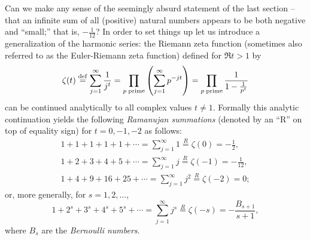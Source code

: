 Can we make any sense  of the seemingly absurd statement of the last section -- that
an infinite sum of all (positive) natural numbers appears to be both negative and ``small;'' that is, $-\frac{1}{12}$?
In order to set things up
let us introduce a generalization of the harmonic series:
the Riemann zeta function (sometimes also referred to as the Euler-Riemann zeta function)
defined for $\Re t > 1$ by
\begin{equation}
\zeta (t) \stackrel{{\rm def}}{=}
\sum_{j=1}^\infty \frac{1}{j^t}
=
\prod_{p\;{\rm prime}} \left(\sum_{j=1}^\infty p^{-jt}\right)
=
\prod_{p\;{\rm prime}} \frac{1}{1-\frac{1}{p^t}}
\label{2016-m-ds-zeta}
\end{equation}
can be  continued analytically to all complex values $t\neq 1$.
Formally this analytic continuation yields the following
{\em Ramanujan summations}  (denoted by an ``R'' on top of equality sign)
for $t=0,-1,-2$ as follows:
\begin{equation}
\begin{split}
1+1+1+1+1 + \cdots = \sum_{j=1}^\infty 1 \stackrel{R}{=} \zeta (0)  = -\frac{1}{2}
, \\
1+2+3+4+5 + \cdots = \sum_{j=1}^\infty j \stackrel{R}{=}  \zeta (-1)  = -\frac{1}{12}
, \\
1+4+9+16+25 + \cdots = \sum_{j=1}^\infty j^2 \stackrel{R}{=}  \zeta (-2)  = 0;
\end{split}
\label{2019-mm-ch-ds-Ramanujan}
\end{equation}
or, more generally,
for $s=1,2,\ldots$,
\begin{equation}
1+2^s+3^s+4^s+5^s + \cdots = \sum_{j=1}^\infty j^s \stackrel{R}{=} \zeta (-s) = -\frac{B_{s+1}}{ s+1}
,
\end{equation}
where $B_s$ are the
{\em Bernoulli numbers}.\cite{Sloane_oeis.org/A027642}

